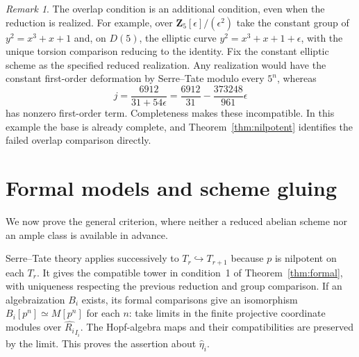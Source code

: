 \documentclass[11pt]{article}
\theoremstyle{definition}\newtheorem{definition}[theorem]{Definition}
\theoremstyle{remark}\newtheorem{remark}[theorem]{Remark}
\begin{document}
\begin{remark}\label{rem:nilpotent-scope}
The overlap condition is an additional condition, even when the reduction is realized. For example, over $\mathbf Z_5[\epsilon]/(\epsilon^2)$ take the constant group of $y^2=x^3+x+1$ and, on $D(5)$, the elliptic curve $y^2=x^3+x+1+\epsilon$, with the unique torsion comparison reducing to the identity. Fix the constant elliptic scheme as the specified reduced realization. Any realization would have the constant first-order deformation by Serre--Tate modulo every $5^n$, whereas
\[
 j=\frac{6912}{31+54\epsilon}
   =\frac{6912}{31}-\frac{373248}{961}\epsilon
\]
has nonzero first-order term. Completeness makes these incompatible. In this example the base is already complete, and Theorem~\ref{thm:nilpotent} identifies the failed overlap comparison directly.
\end{remark}

\section{Formal models and scheme gluing}

We now prove the general criterion, where neither a reduced abelian scheme nor an ample class is available in advance.

Serre--Tate theory applies successively to $T_r\hookrightarrow T_{r+1}$ because $p$ is nilpotent on each $T_r$. It gives the compatible tower in condition~1 of Theorem~\ref{thm:formal}, with uniqueness respecting the previous reduction and group comparison. If an algebraization $B_i$ exists, its formal comparisons give an isomorphism $B_i[p^n]\simeq M[p^n]$ for each $n$: take limits in the finite projective coordinate modules over $\widehat{R_i}_{I_i}$. The Hopf-algebra maps and their compatibilities are preserved by the limit. This proves the assertion about $\widehat\eta_i$.
\end{document}
